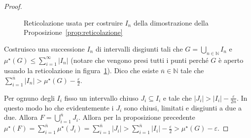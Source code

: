 \begin{proof}
\begin{figure}[ht]
    \centering
    \caption{Reticolazione usata per costruire \(I_{n}\) della dimostrazione
della Proposizione~\ref{prop:reticolazione}}\label{fig:reticolazione}
\end{figure}
Costruisco una successione \(I_{n}\) di intervalli disgiunti tali che \(G =
\bigcup_{n \in \mathbb{N}} I_{n} \) e \(\mu^\star(G) \le \sum_{i=1}^{\infty}
|I_{n}| \) (notare che vengono presi tutti i punti perché \(G\) è aperto usando
la reticolazione in figura~\ref{fig:reticolazione}). Dico che esiste
\(\overline{n} \in \mathbb{N}\) tale che \(\sum_{i=1}^{\overline{n}} |I_{n}| >
\mu^\star(G) - \frac{\varepsilon}{2} \).

Per ognuno degli \(I_{i}\) fisso un intervallo chiuso \(J_{i} \subseteq I_{i} \)
e tale che \(|J_{i}| > |I_{i}| - \frac{\varepsilon}{2\overline{n}}\). In questo modo ho
che evidentemente i \(J_{i}\) sono chiusi, limitati e disgiunti a due a due.
Allora \(F = \bigcup_{i=1}^{\overline{n}}J_{i} \). Allora per la proposizione
precedente \(\mu^\star(F) = \sum_{i=1}^{\overline{n}} \mu^\star(J_{i}) =
\sum_{i=1}^{\overline{n}} |J_{i}| > \sum_{i=1}^{\overline{n}} |I_{i}| -
\frac{\varepsilon}{2} > \mu^\star(G) - \varepsilon \).
\end{proof}

